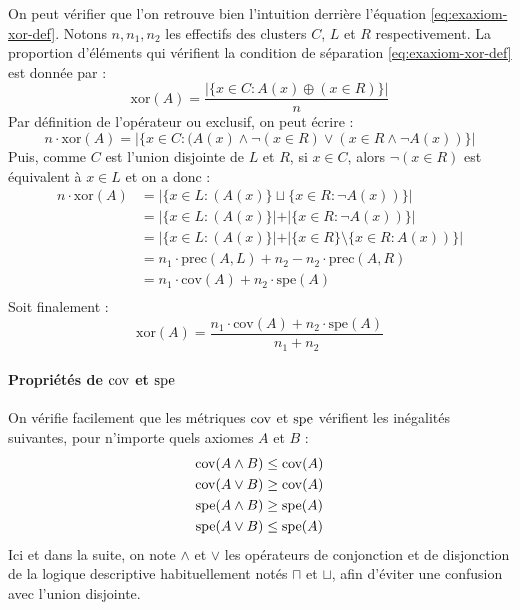 On peut vérifier que l'on retrouve bien l'intuition derrière l'équation \ref{eq:exaxiom-xor-def}. Notons $n, n_1, n_2$ les effectifs des clusters $C$, $L$ et $R$ respectivement. La proportion d'éléments qui vérifient la condition de séparation \ref{eq:exaxiom-xor-def} est donnée par :
\begin{equation}
    \text{xor}(A) = \frac{| \{x \in C : A(x) \oplus (x \in R) \}|}{n}
\end{equation}
Par définition de l'opérateur ou exclusif, on peut écrire :
\begin{equation}
    n \cdot \text{xor}(A) = |\{x \in C: (A(x) \land \neg (x \in R) \lor (x \in R \land \neg A(x)) \}|
\end{equation}
Puis, comme $C$ est l'union disjointe de $L$ et $R$, si $x \in C$, alors $\neg (x \in R)$ est équivalent à $x \in L$ et on a donc :
\begin{align*}
    n \cdot \text{xor}(A) &= |\{x \in L: (A(x)\} \sqcup \{x \in R : \neg A(x)) \}| \\
    &= |\{x \in L: (A(x)\} | + | \{x \in R : \neg A(x)) \}|  \\
    &= |\{x \in L: (A(x)\} | + | \{x \in R \} \setminus \{x \in R : A(x)) \}| \\
    &= n_1 \cdot \text{prec}(A, L) + n_2 - n_2 \cdot \text{prec}(A, R) \\
    &= n_1 \cdot \text{cov}(A) + n_2 \cdot \text{spe}(A) \\
\end{align*}
Soit finalement :
\begin{equation}
    \text{xor}(A) = \frac{n_1 \cdot \text{cov}(A) + n_2 \cdot \text{spe}(A)}{n_1 + n_2}
\end{equation}

\paragraph{Propriétés de $\operatorname{cov}$ et $\operatorname{spe}$}

On vérifie facilement que les métriques $\operatorname{cov}$ et $\operatorname{spe}$ vérifient les inégalités suivantes, pour n'importe quels axiomes $A$ et $B$ :
\begin{align}
    \operatorname{cov}(A \land B) & \leq \operatorname{cov}(A) \\
    \operatorname{cov}(A \lor B) & \geq \operatorname{cov}(A)  \label{eq:cov-disjunct} \\
    \operatorname{spe}(A \land B) & \geq \operatorname{spe}(A) \label{eq:cov-conjunct} \\
    \operatorname{spe}(A \lor B) & \leq \operatorname{spe}(A)
\end{align}
Ici et dans la suite, on note $\land$ et $\lor$ les opérateurs de conjonction et de disjonction de la logique descriptive habituellement notés $\sqcap$ et $\sqcup$, afin d'éviter une confusion avec l'union disjointe.

